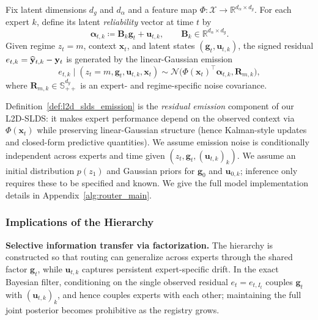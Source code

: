 \begin{definition}
\label{def:l2d_slds_emission}
	Fix latent dimensions \(d_g\) and \(d_\alpha\) and a feature map
	\(\Phi:\mathcal{X}\to\mathbb{R}^{d_\alpha\times d_y}\).
	For each expert \(k\), define its latent \emph{reliability} vector at time \(t\) by
	\begin{equation}
	\label{eq:alpha_def}
	\boldsymbol\alpha_{t,k}\coloneqq \mathbf{B}_k\mathbf{g}_t+\mathbf{u}_{t,k},
	\qquad
	\mathbf{B}_k\in\mathbb{R}^{d_\alpha\times d_g}.
	\end{equation}
	Given regime \(z_t=m\), context \(\mathbf{x}_t\), and latent states \((\mathbf{g}_t,\mathbf{u}_{t,k})\),
	the signed residual \(e_{t,k}=\widehat{\mathbf{y}}_{t,k}-\mathbf{y}_t\) is generated by the linear-Gaussian emission
	\begin{equation*}
	\label{eq:residual_emission}
	e_{t,k}\mid (z_t=m,\mathbf{g}_t,\mathbf{u}_{t,k},\mathbf{x}_t)
	\sim
	\mathcal{N}\big(\Phi(\mathbf{x}_t)^\top\boldsymbol\alpha_{t,k},\mathbf{R}_{m,k}\big),
	\end{equation*}
	where \(\mathbf{R}_{m,k}\in\mathbb{S}^{d_y}_{++}\) is an expert- and regime-specific noise covariance.
\end{definition}

Definition~\ref{def:l2d_slds_emission} is the \emph{residual emission} component of our L2D-SLDS: it
makes expert performance depend on the observed context via \(\Phi(\mathbf{x}_t)\) while preserving
linear-Gaussian structure (hence Kalman-style updates and closed-form predictive quantities). We
assume emission noise is conditionally independent across experts and time given
\((z_t,\mathbf{g}_t,(\mathbf{u}_{t,k})_k)\). We assume an initial distribution \(p(z_1)\) and Gaussian priors for \(\mathbf{g}_0\) and
\(\mathbf{u}_{0,k}\); inference only requires these to be specified and known. We give the full model implementation
details in Appendix~\ref{alg:router_main}.

\subsubsection{Implications of the Hierarchy}

\textbf{Selective information transfer via factorization.}
The hierarchy is constructed so that routing can generalize across experts through the shared factor
\(\mathbf{g}_t\), while \(\mathbf{u}_{t,k}\) captures persistent expert-specific drift. In the exact
Bayesian filter, conditioning on the single observed residual \(e_t=e_{t,I_t}\) couples
\(\mathbf{g}_t\) with \((\mathbf{u}_{t,k})_k\), and hence couples experts with each other; maintaining
the full joint posterior becomes prohibitive as the registry grows.

